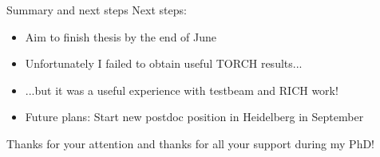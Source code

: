 \documentclass{beamer}
\begin{document}
\begin{frame}{Summary and next steps}
  \vspace{0.0cm}
  {\Large Next steps:}
  \vspace{0.5cm}
  \begin{itemize}
    \setlength\itemsep{1.0em}
    \item{Aim to finish thesis by the end of June}
    \item{Unfortunately I failed to obtain useful TORCH results...}
    \item{...but it was a useful experience with testbeam and RICH work!}
    \item{Future plans: Start new postdoc position in Heidelberg in September}
  \end{itemize}
  \vspace{0.4cm}
  \begin{center}
    {\huge Thanks for your attention and thanks for all your support during my PhD!}
  \end{center}
\end{frame}
\end{document}
